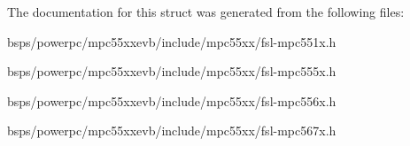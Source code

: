 The documentation for this struct was generated from the following files\+:\begin{DoxyCompactItemize}
\item 
bsps/powerpc/mpc55xxevb/include/mpc55xx/fsl-\/mpc551x.\+h\item 
bsps/powerpc/mpc55xxevb/include/mpc55xx/fsl-\/mpc555x.\+h\item 
bsps/powerpc/mpc55xxevb/include/mpc55xx/fsl-\/mpc556x.\+h\item 
bsps/powerpc/mpc55xxevb/include/mpc55xx/fsl-\/mpc567x.\+h\end{DoxyCompactItemize}

